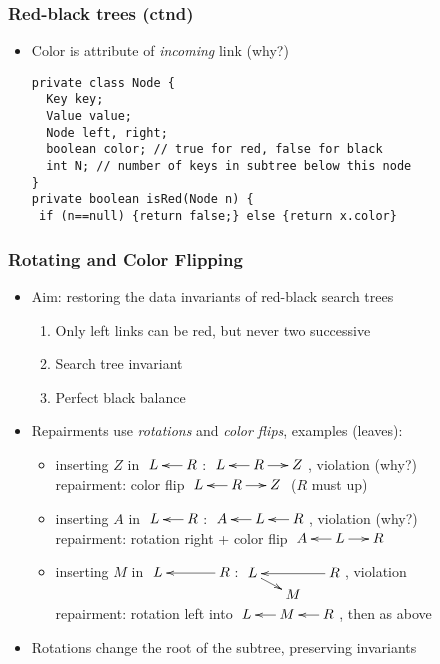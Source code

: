 \documentclass[handout]{beamer}
\begin{document}
\begin{frame}[fragile]
    \frametitle{Red-black trees (ctnd)}

\begin{itemize}[<+->]
\item Color is attribute of \emph{incoming} link (why?)
\begin{verbatim}
private class Node {
  Key key;
  Value value;
  Node left, right;
  boolean color; // true for red, false for black
  int N; // number of keys in subtree below this node
}
private boolean isRed(Node n) {
 if (n==null) {return false;} else {return x.color}
\end{verbatim}
\end{itemize}     
\end{frame}

\begin{frame}[fragile]
    \frametitle{Rotating and Color Flipping}

\begin{itemize}[<+->]
\item Aim: restoring the data invariants of red-black search trees
  \begin{enumerate}[<+->]
  \item Only left links can be red, but never two successive
  \item Search tree invariant
  \item Perfect black balance
  \end{enumerate}
\item Repairments use \emph{rotations} and \emph{color flips}, examples (leaves):
  \begin{itemize}[<+->]
  \item inserting $Z$ in
  $\xymatrix@R=.1cm@C=.5cm{L&\ar@{>}@[red][l]R}$:
  $\xymatrix@R=.1cm@C=.5cm{L&\ar@{>}@[red][l]R\ar@{>}@[red][r]&Z}$,
  violation (why?)\\
 repairment:  color flip
  $\xymatrix@R=.1cm@C=.5cm{L&\ar@{>}[l]R\ar@{>}[r]&Z}$ ($R$ must up)

  \item inserting $A$ in
  $\xymatrix@R=.1cm@C=.5cm{L&\ar@{>}@[red][l]R}$:
  $\xymatrix@R=.1cm@C=.5cm{A&\ar@{>}@[red][l]L&\ar@{>}@[red][l]R}$,
  violation (why?)\\
  repairment:
  rotation right + color flip
  $\xymatrix@R=.1cm@C=.5cm{A&\ar@{>}[l]L\ar@{>}[r]&R}$

  \item inserting $M$ in
  $\xymatrix@R=.1cm@C=.5cm{L&&\ar@{>}@[red][ll]R}$:
  $\xymatrix@R=.1cm@C=.5cm{L\ar@{>}@[red][rd]&&\ar@{>}@[red][ll]R\\&M}$,
  violation\\
  repairment:
  rotation left into
  $\xymatrix@R=.1cm@C=.5cm{L&\ar@{>}@[red][l]M&\ar@{>}@[red][l]R}$,
  then as above
  \end{itemize}
  \item Rotations change the root of the subtree, preserving invariants
\end{itemize}     
\end{frame}
\end{document}
